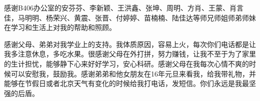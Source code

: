 \begin{thanks}
感谢B406办公室的安芬芬、李新颖、王洪鑫、张坤、周明、方肖、王蒙、肖言佳，马明明、杨荣兴、黄震、张晋、付婷婷、苗楠楠、陆佳达等师兄师姐师弟师妹在学习和生活上对我的帮助和照顾。

感谢父母、弟弟对我学业上的支持。我体质原因，容易上火，每次你们电话都是让我多注意休息，多吃水果。很感谢父母在外打拼，努力赚钱，让我不至于为了家里的生计担忧，能够静下心来好好学习，安心科研。感谢父母在我每次心情不爽的时候可以安慰我，鼓励我。感谢弟弟和他女朋友在16年元旦来看我，给我带礼物，并能够在节假日或者北京天气有变化的时候给我打电话，发短信。你们永远是我最坚强的后盾。


\end{thanks}













